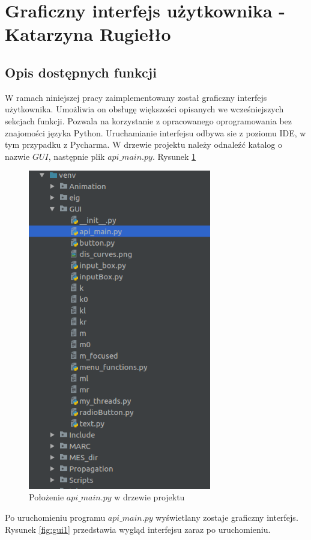 \section{Graficzny interfejs użytkownika - Katarzyna Rugiełło}

\subsection{Opis dostępnych funkcji}
W ramach niniejszej pracy zaimplementowany został graficzny interfejs użytkownika. Umożliwia on obsługę większości opisanych we wcześniejszych sekcjach funkcji. Pozwala na korzystanie z opracowanego oprogramowania bez znajomości języka Python. Uruchamianie interfejsu odbywa sie z poziomu IDE, w tym przypadku z Pycharma. W drzewie projektu należy odnaleźć katalog o nazwie $GUI$, następnie plik $api\_main.py$. Rysunek \ref{fig:gui_tu_jest}

\begin{figure}[h]
\centering
\includegraphics[width=8cm]{Zdjecia/5/kasia/gui_drzewo}
\caption{Położenie $api\_main.py$ w drzewie projektu}
\label{fig:gui_tu_jest}
\end{figure}

Po uruchomieniu programu $api\_main.py$ wyświetlany zostaje graficzny interfejs. Rysunek \ref{fig:gui1} przedstawia wygląd interfejsu zaraz po uruchomieniu.

